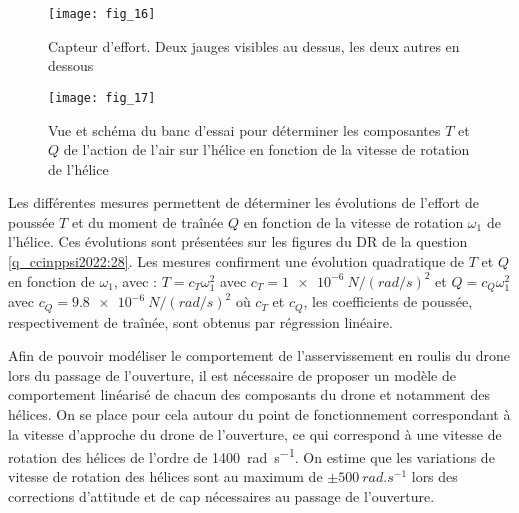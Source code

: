 \begin{figure}[H]
\centering
\texttt{[image: fig\_16]}
\caption{\label{fig_ccinppsi2022:16} Capteur d’effort. Deux jauges visibles au dessus, les deux autres en dessous}
\end{figure}

\begin{figure}[H]
\centering
\texttt{[image: fig\_17]}
\caption{\label{fig_ccinppsi2022:17} Vue et schéma du banc d’essai pour déterminer les composantes $T$ et $Q$ de
l’action de l’air sur l’hélice en fonction de la vitesse de rotation de l’hélice}
\end{figure}

Les différentes mesures permettent de déterminer les évolutions de l’effort de poussée $T$ et
du moment de traînée $Q$ en fonction de la vitesse de rotation $\omega_1$ de l’hélice. Ces évolutions
sont présentées sur les figures du DR de la question \ref{q_ccinppsi2022:28}. Les mesures confirment une évolution
quadratique de $T$ et $Q$ en fonction de $\omega_1$, avec :
$T = c_T \omega_1^2$ avec $c_T = \SI{1e-6}{N/(rad/s)^2}$ et
$Q = c_Q \omega_1^2$ avec $c_Q = \SI{9.8e-6}{N/(rad/s)^2}$ 
où $c_T$ et $c_Q$, les coefficients de poussée, respectivement de traînée, sont obtenus par régression linéaire.

Afin de pouvoir modéliser le comportement de l’asservissement en roulis du drone lors du
passage de l’ouverture, il est nécessaire de proposer un modèle de comportement linéarisé
de chacun des composants du drone et notamment des hélices. On se place pour cela autour
du point de fonctionnement correspondant à la vitesse d’approche du drone de l’ouverture,
ce qui correspond à une vitesse de rotation des hélices de l’ordre de \SI{1400}{rad.s^{-1}}. On estime
que les variations de vitesse de rotation des hélices sont au maximum de $\pm \SI{500}{rad.s^{-1}}$ lors
des corrections d’attitude et de cap nécessaires au passage de l’ouverture.

\ifprof
\begin{corrige}
\end{corrige}
\else
\fi

